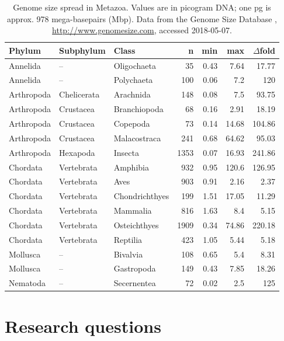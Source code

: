 \begin{table}
\centering\footnotesize
\caption[Genome size spread in Metazoa]{Genome size spread in Metazoa.
Values are in picogram DNA; one pg is approx. 978 mega-basepairs (Mbp).
Data from the Genome Size Database \citep{Gregory2018},
\url{http://www.genomesize.com}, accessed 2018-05-07.}
\label{tab:genome-size-spread}
\begin{tabular}{@{}lllrrrr@{}}
\toprule
Phylum     & Subphylum   & Class          & n    & min  & max   & $\Delta$fold \\
\midrule
Annelida   & --          & Oligochaeta    & 35   & 0.43 & 7.64  & 17.77  \\
Annelida   & --          & Polychaeta     & 100  & 0.06 & 7.2   & 120    \\
Arthropoda & Chelicerata & Arachnida      & 148  & 0.08 & 7.5   & 93.75  \\
Arthropoda & Crustacea   & Branchiopoda   & 68   & 0.16 & 2.91  & 18.19  \\
Arthropoda & Crustacea   & Copepoda       & 73   & 0.14 & 14.68 & 104.86 \\
Arthropoda & Crustacea   & Malacostraca   & 241  & 0.68 & 64.62 & 95.03  \\
Arthropoda & Hexapoda    & Insecta        & 1353 & 0.07 & 16.93 & 241.86 \\
Chordata   & Vertebrata  & Amphibia       & 932  & 0.95 & 120.6 & 126.95 \\
Chordata   & Vertebrata  & Aves           & 903  & 0.91 & 2.16  & 2.37   \\
Chordata   & Vertebrata  & Chondrichthyes & 199  & 1.51 & 17.05 & 11.29  \\
Chordata   & Vertebrata  & Mammalia       & 816  & 1.63 & 8.4   & 5.15   \\
Chordata   & Vertebrata  & Osteichthyes   & 1909 & 0.34 & 74.86 & 220.18 \\
Chordata   & Vertebrata  & Reptilia       & 423  & 1.05 & 5.44  & 5.18   \\
Mollusca   & --          & Bivalvia       & 108  & 0.65 & 5.4   & 8.31   \\
Mollusca   & --          & Gastropoda     & 149  & 0.43 & 7.85  & 18.26  \\
Nematoda   & --          & Secernentea    & 72   & 0.02 & 2.5   & 125    \\
\bottomrule
\end{tabular}
\end{table}

\section{Research questions}

